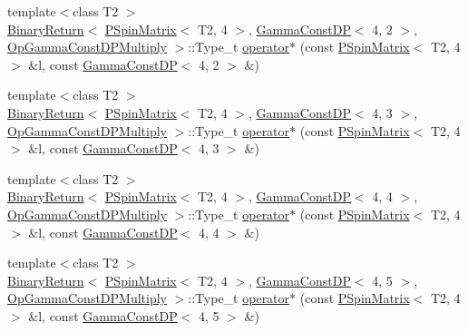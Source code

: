 \begin{DoxyCompactItemize}
\item 
{\footnotesize template$<$class T2 $>$ }\\\mbox{\hyperlink{structENSEM_1_1BinaryReturn}{Binary\+Return}}$<$ \mbox{\hyperlink{classENSEM_1_1PSpinMatrix}{P\+Spin\+Matrix}}$<$ T2, 4 $>$, \mbox{\hyperlink{classENSEM_1_1GammaConstDP}{Gamma\+Const\+DP}}$<$ 4, 2 $>$, \mbox{\hyperlink{structENSEM_1_1OpGammaConstDPMultiply}{Op\+Gamma\+Const\+D\+P\+Multiply}} $>$\+::Type\+\_\+t \mbox{\hyperlink{group__primspinmatrix_ga6c042cd1d538338f171e9e0b588b7b8e}{operator$\ast$}} (const \mbox{\hyperlink{classENSEM_1_1PSpinMatrix}{P\+Spin\+Matrix}}$<$ T2, 4 $>$ \&l, const \mbox{\hyperlink{classENSEM_1_1GammaConstDP}{Gamma\+Const\+DP}}$<$ 4, 2 $>$ \&)
\item 
{\footnotesize template$<$class T2 $>$ }\\\mbox{\hyperlink{structENSEM_1_1BinaryReturn}{Binary\+Return}}$<$ \mbox{\hyperlink{classENSEM_1_1PSpinMatrix}{P\+Spin\+Matrix}}$<$ T2, 4 $>$, \mbox{\hyperlink{classENSEM_1_1GammaConstDP}{Gamma\+Const\+DP}}$<$ 4, 3 $>$, \mbox{\hyperlink{structENSEM_1_1OpGammaConstDPMultiply}{Op\+Gamma\+Const\+D\+P\+Multiply}} $>$\+::Type\+\_\+t \mbox{\hyperlink{group__primspinmatrix_ga7049c9a95590816eb50f8755c19aac7e}{operator$\ast$}} (const \mbox{\hyperlink{classENSEM_1_1PSpinMatrix}{P\+Spin\+Matrix}}$<$ T2, 4 $>$ \&l, const \mbox{\hyperlink{classENSEM_1_1GammaConstDP}{Gamma\+Const\+DP}}$<$ 4, 3 $>$ \&)
\item 
{\footnotesize template$<$class T2 $>$ }\\\mbox{\hyperlink{structENSEM_1_1BinaryReturn}{Binary\+Return}}$<$ \mbox{\hyperlink{classENSEM_1_1PSpinMatrix}{P\+Spin\+Matrix}}$<$ T2, 4 $>$, \mbox{\hyperlink{classENSEM_1_1GammaConstDP}{Gamma\+Const\+DP}}$<$ 4, 4 $>$, \mbox{\hyperlink{structENSEM_1_1OpGammaConstDPMultiply}{Op\+Gamma\+Const\+D\+P\+Multiply}} $>$\+::Type\+\_\+t \mbox{\hyperlink{group__primspinmatrix_gabdda28125d8262f0d1b4f071aaa969eb}{operator$\ast$}} (const \mbox{\hyperlink{classENSEM_1_1PSpinMatrix}{P\+Spin\+Matrix}}$<$ T2, 4 $>$ \&l, const \mbox{\hyperlink{classENSEM_1_1GammaConstDP}{Gamma\+Const\+DP}}$<$ 4, 4 $>$ \&)
\item 
{\footnotesize template$<$class T2 $>$ }\\\mbox{\hyperlink{structENSEM_1_1BinaryReturn}{Binary\+Return}}$<$ \mbox{\hyperlink{classENSEM_1_1PSpinMatrix}{P\+Spin\+Matrix}}$<$ T2, 4 $>$, \mbox{\hyperlink{classENSEM_1_1GammaConstDP}{Gamma\+Const\+DP}}$<$ 4, 5 $>$, \mbox{\hyperlink{structENSEM_1_1OpGammaConstDPMultiply}{Op\+Gamma\+Const\+D\+P\+Multiply}} $>$\+::Type\+\_\+t \mbox{\hyperlink{group__primspinmatrix_gaf7e4830f4ad99e0601dccbd49cb97662}{operator$\ast$}} (const \mbox{\hyperlink{classENSEM_1_1PSpinMatrix}{P\+Spin\+Matrix}}$<$ T2, 4 $>$ \&l, const \mbox{\hyperlink{classENSEM_1_1GammaConstDP}{Gamma\+Const\+DP}}$<$ 4, 5 $>$ \&)

\end{DoxyCompactItemize}
